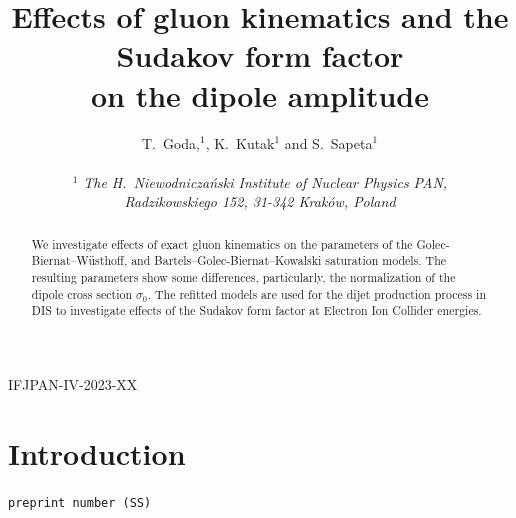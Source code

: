 \documentclass[11pt]{article}
\author{
T.~Goda,$^1$, K.~Kutak$^{1}$ and S.~Sapeta$^1$\\\,\\
$^1$ 
{\small\it The H.\ Niewodnicza\'nski Institute of Nuclear Physics PAN,}\\ 
{\small\it Radzikowskiego 152, 31-342 Krak\'ow, Poland}\\
}
\title{Effects of gluon kinematics and the Sudakov form factor\\ on the dipole amplitude}
\date{}
\newcommand{\comment}[1]{\texttt{\color{red}#1}}
\begin{document}
\maketitle

\vspace{-22em}
\begin{flushright}
  IFJPAN-IV-2023-XX
\end{flushright}
\vspace{17.5em}

\begin{abstract}
We investigate effects of exact gluon kinematics on the parameters of the
Golec-Biernat--W\"usthoff, and Bartels--Golec-Biernat--Kowalski saturation
models. The resulting parameters show some differences, particularly, the
normalization of the dipole cross section $\sigma_0$. The refitted models are
used for the dijet production process in DIS to investigate effects of the
Sudakov form factor at Electron Ion Collider energies.  
\end{abstract}

\section{Introduction}

\comment{preprint number (SS)}\\
\end{document}
